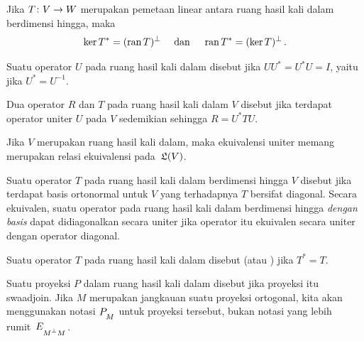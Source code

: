 \begin{thm}\label{00016025} Jika
$T\colon V \rightarrow W$ merupakan pemetaan linear antara ruang hasil kali dalam berdimensi hingga, maka
   \[ \ker T^* = (\operatorname{ran} T)^\perp \quad \text{ dan } \quad \operatorname{ran} T^* = (\ker T)^\perp\,. \]
\end{thm}

\begin{defn}\label{000161} Suatu operator $U$ pada ruang hasil kali dalam disebut
 jika $UU^* = U^*U = I$, yaitu jika $U^* = U^{-1}$.
\end{defn}

\begin{defn}\label{0001612} Dua operator $R$ dan $T$ pada ruang hasil kali dalam $V$ disebut
 jika terdapat operator uniter $U$ pada $V$ sedemikian sehingga $R =
U^*TU$.
\end{defn}

\begin{prop} Jika $V$ merupakan ruang hasil kali dalam, maka ekuivalensi uniter memang merupakan
relasi ekuivalensi pada~$\mathfrak{L}(V)$.
\end{prop}

\begin{defn} Suatu operator $T$ pada ruang hasil kali dalam berdimensi hingga $V$ disebut
 jika terdapat basis ortonormal untuk $V$ yang terhadapnya
$T$ bersifat diagonal. Secara ekuivalen, suatu operator pada ruang hasil kali dalam berdimensi hingga
\emph{dengan basis} dapat didiagonalkan secara uniter jika operator itu ekuivalen secara uniter dengan operator
diagonal.
\end{defn}

\begin{defn} Suatu operator $T$ pada ruang hasil kali dalam disebut
 (atau
) jika $T^* = T$.
\end{defn}

\begin{defn}\label{000164} Suatu proyeksi $P$ dalam ruang hasil kali dalam disebut
 jika proyeksi itu swaadjoin. Jika $M$ merupakan jangkauan suatu proyeksi
ortogonal, kita akan menggunakan notasi
$P_{{}_{\scriptstyle{M}}}$ untuk proyeksi tersebut, bukan notasi yang lebih rumit~$E_{{}_{\scriptstyle{M^\perp M}}}$.
\end{defn}

